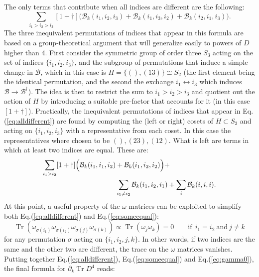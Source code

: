 \documentclass[12pt,a4paper]{article}
\DeclareMathOperator{\Tr}{Tr}
\begin{document}
The only terms that contribute when all indices are different are the following:
\begin{equation} \label{eq:alldifferent}
\sum_{i_1 > i_2 > i_3} [1+\dagger] \Big( \mathcal{B}_k(i_1, i_2, i_3) + \mathcal{B}_k(i_1, i_3, i_2) + \mathcal{B}_k(i_2, i_1, i_3) \Big).
\end{equation}
The three inequivalent permutations of indices that appear in this formula are based on a group-theoretical argument that will generalize easily to powers of $D$ higher than 4. First consider the symmetric group of order three $S_3$ acting on the set of indices $\{i_1, i_2, i_3\}$, and the subgroup of permutations that induce a simple change in $\mathcal{B}$, which in this case is $H = \{(), (13)\} \cong S_2$ (the first element being the identical permutation, and the second the exchange $i_1 \leftrightarrow i_3$ which induces $\mathcal{B} \rightarrow \mathcal{B}^\dagger$). The idea is then to restrict the sum to $i_1 > i_2 > i_3$ and quotient out the action of $H$ by introducing a suitable pre-factor that accounts for it (in this case $[1+\dagger]$). Practically, the inequivalent permutations of indices that appear in Eq.(\ref{eq:alldifferent}) are found by computing the (left or right) cosets of $H \subset S_3$ and acting on $\{i_1, i_2, i_3\}$ with a representative from each coset. In this case the representatives where chosen to be $(), (23), (12)$.\newline
What is left are terms in which at least two indices are equal. These are:
\begin{align} \label{eq:someequal}
\sum_{i_1 > i_2} [1+\dagger] \Big( \mathcal{B}_k(i_1, i_1, i_2) &+ \mathcal{B}_k(i_1, i_2, i_2) \Big) + \notag \\
&\sum_{i_1 \neq i_2} \mathcal{B}_k(i_1, i_2, i_1) + \sum_{i} \mathcal{B}_k(i,i,i).
\end{align}
At this point, a useful property of the $\omega$ matrices can be exploited to simplify both Eq.(\ref{eq:alldifferent}) and Eq.(\ref{eq:someequal}):
\begin{equation}\label{eq:gamma0}
\Tr(\omega_{\sigma(i_1)} \omega_{\sigma(i_2)} \omega_{\sigma(j)} \omega_{\sigma(k)}) \propto \Tr(\omega_j \omega_k) = 0 \qquad \text{if} \ \ i_1 = i_2 \ \text{and} \ j \neq k
\end{equation}
for any permutation $\sigma$ acting on $\{i_1, i_2, j, k\}$. In other words, if two indices are the same and the other two are different, the trace on the $\omega$ matrices vanishes.\newline
Putting together Eq.(\ref{eq:alldifferent}), Eq.(\ref{eq:someequal}) and Eq.(\ref{eq:gamma0}), the final formula for $\partial_k \Tr D^4$ reads:
\end{document}
